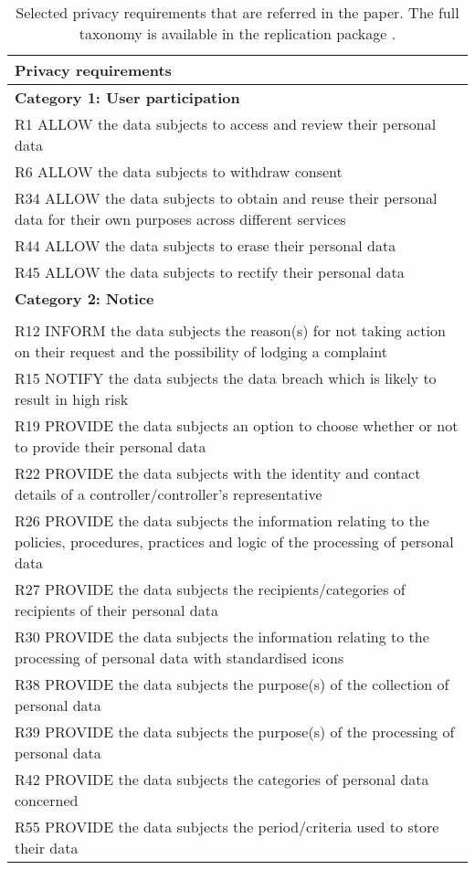 \begin{table}[htbp]
	\caption{Selected privacy requirements that are referred in the paper. The full taxonomy is available in the replication package \cite{reppkg-pridp}.}
	\label{tab:sample-requirements}
	\small
	\begin{tabular}{p{8.5cm}}
		\toprule %
		\textbf{Privacy requirements}\\
		\midrule %
		
		\textbf{Category 1: User participation} \\
		R1 ALLOW the data subjects to access and review their personal data \\
		R6 ALLOW the data subjects to withdraw consent \\
		R34 ALLOW the data subjects to obtain and reuse their personal data for their own purposes across different services \\
		R44 ALLOW the data subjects to erase their personal data     \\
		R45 ALLOW the data subjects to rectify their personal data \\
		
		\vspace{1mm}
		
		\textbf{Category 2: Notice} \\
		\newtext{\textbf{Subcategory 2.1: Data subjects}} \\
		R12 INFORM the data subjects the reason(s) for not taking action on their request and the possibility of lodging a complaint \\
		R15 NOTIFY the data subjects the data breach which is likely to result in high risk \\
		R19 PROVIDE the data subjects an option to choose whether or not to provide their personal data \\
		R22 PROVIDE the data subjects with the identity and contact details of a controller/controller's representative \\
		R26 PROVIDE the data subjects the information relating to the policies, procedures, practices and logic of the processing of personal data   \\
		R27 PROVIDE the data subjects the recipients/categories of recipients of their personal data   \\
		R30 PROVIDE the data subjects the information relating to the processing of personal data with standardised icons \\
		R38 PROVIDE the data subjects the purpose(s) of the collection of personal data      \\
		R39 PROVIDE the data subjects the purpose(s) of the processing of personal data \\
		R42 PROVIDE the data subjects the categories of personal data concerned  \\			
		R55 PROVIDE the data subjects the period/criteria used to store their data \\
		

\end{tabular}
\end{table}
